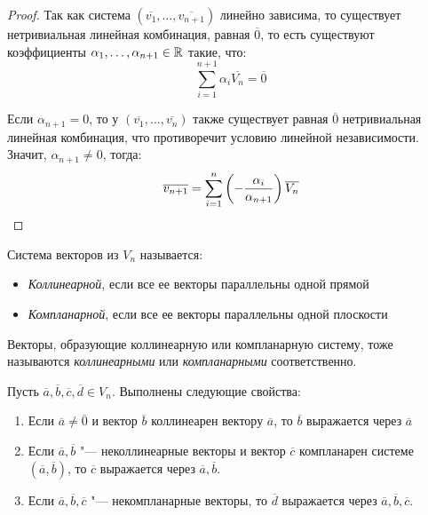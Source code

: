 \begin{proof}
	Так как система $(\overline{v_1}, \dots, \overline{v_{n + 1}})$ линейно зависима, то существует нетривиальная линейная комбинация, равная $\overline{0}$, то есть существуют коэффициенты $\alpha_1, \dotsc, \alpha_{n+1} \in \mathbb{R}$ такие, что:
	\[\sum_{i = 1}^{n+1}\alpha_i\overline{V_n} = \overline{0}\]
	
	Если $\alpha_{n + 1} = 0$, то у $(\overline{v_1}, \dots, \overline{v_n})$ также существует равная $\overline{0}$ нетривиальная линейная комбинация, что противоречит условию линейной независимости. Значит, $\alpha_{n + 1} \ne 0$, тогда:
	\[\overline{v_{n + 1}} = \sum_{i = 1}^{n}\left(-\frac{\alpha_i}{\alpha_{n + 1}}\right)\overline{V_n}\qedhere\]
\end{proof}

\begin{definition}
	Система векторов из $V_n$ называется:
	\begin{itemize}
		\item \textit{Коллинеарной}, если все ее векторы параллельны одной прямой
		\item \textit{Компланарной}, если все ее векторы параллельны одной плоскости
	\end{itemize}
	
	Векторы, образующие коллинеарную или компланарную систему, тоже называются \textit{коллинеарными} или \textit{компланарными} соответственно.
\end{definition}

\begin{proposition}
	Пусть $\overline{a}, \overline{b}, \overline{c}, \overline{d} \in V_n$. Выполнены следующие свойства:
	\begin{enumerate}
		\item Если $\overline{a} \ne \overline{0}$ и вектор $\overline{b}$ коллинеарен вектору $\overline{a}$, то $\overline{b}$ выражается через $\overline{a}$
		\item Если $\overline{a}, \overline{b}$ "--- неколлинеарные векторы и вектор $\overline{c}$ компланарен системе $(\overline{a}, \overline{b})$, то $\overline{c}$ выражается через $\overline{a}, \overline{b}$.
		\item Если $\overline{a}, \overline{b}, \overline{c}$ "--- некомпланарные векторы, то $\overline{d}$ выражается через $\overline{a}, \overline{b}, \overline{c}$.
	\end{enumerate}
\end{proposition}

